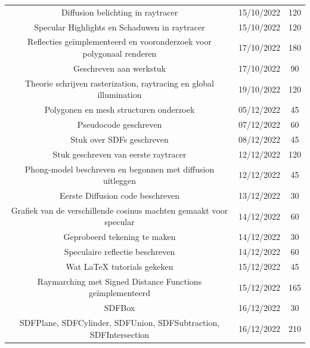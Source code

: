 \documentclass[12pt, a4paper]{article}
\begin{document}
\begin{table}[!htp]
{\begin{tabular}{| c c c |}
			Diffusion belichting in raytracer                                    & 15/10/2022 & 120            \\
			Specular Highlights en Schaduwen in raytracer                        & 15/10/2022 & 120            \\
			Reflecties geïmplementeerd en vooronderzoek voor polygonaal renderen & 17/10/2022 & 180            \\
			Geschreven aan werkstuk                                              & 17/10/2022 & 90             \\
			Theorie schrijven rasterization, raytracing en global illumination   & 19/10/2022 & 120            \\
			Polygonen en mesh structuren onderzoek                               & 05/12/2022 & 45             \\
			Pseudocode geschreven                                                & 07/12/2022 & 60             \\
			Stuk over SDFs geschreven                                            & 08/12/2022 & 45             \\
			Stuk geschreven van eerste raytracer                                 & 12/12/2022 & 120            \\
			Phong-model beschreven en begonnen met diffusion uitleggen           & 12/12/2022 & 45             \\
			Eerste Diffusion code beschreven                                     & 13/12/2022 & 30             \\
			Grafiek van de verschillende cosinus machten gemaakt voor specular   & 14/12/2022 & 60             \\
			Geprobeerd tekening te maken                                         & 14/12/2022 & 30             \\
			Speculaire reflectie beschreven                                      & 14/12/2022 & 60             \\
			Wat LaTeX tutorials gekeken                                          & 15/12/2022 & 45             \\
			Raymarching met Signed Distance Functions geïmplementeerd            & 15/12/2022 & 165            \\
			SDFBox                                                               & 16/12/2022 & 30             \\
			SDFPlane, SDFCylinder, SDFUnion, SDFSubtraction, SDFIntersection     & 16/12/2022 & 210            \\

\end{tabular}}
\end{table}
\end{document}
